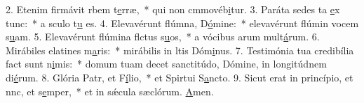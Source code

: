 2. Etenim firmávit rbem t\uline{e}rræ,~* qui non cmmovéb\uline{i}tur.
3. Paráta sedes ta \uline{e}x tunc:~* a sculo t\uline{u} es.
4. Elevavérunt flúmna, D\uline{ó}mine:~* elevavérunt flúmin vocem s\uline{u}am.
5. Elevavérunt flúmina flctus s\uline{u}os,~* a vócibus arum mult\uline{á}rum.
6. Mirábiles elatines m\uline{a}ris:~* mirábilis in ltis Dóm\uline{i}nus.
7. Testimónia tua credibília fact sunt n\uline{i}mis:~* domum tuam decet sanctitúdo, Dómine, in longitúdnem di\uline{é}rum.
8. Glória Patr, et F\uline{í}lio,~* et Spirtui S\uline{a}ncto.
9. Sicut erat in princípio, et nnc, et s\uline{e}mper,~* et in sǽcula sæclórum. \uline{A}men.
